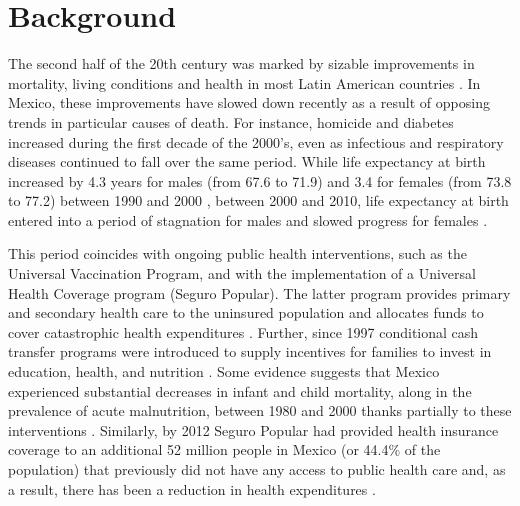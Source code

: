 \documentclass{bmcart}
\begin{document}



\section*{Background}
The second half of the 20th century was marked by sizable improvements in mortality, living
conditions and health in most Latin American countries \cite{who2000}. 
In Mexico, these improvements have slowed down recently as a result of opposing
trends in particular causes of death. For instance, homicide and diabetes
increased during the first decade of the 2000's, even as infectious and
respiratory diseases continued to fall over the same period. While life
expectancy at birth increased by 4.3 years for males (from 67.6 to 71.9) and 3.4
for females (from 73.8 to 77.2) between 1990 and 2000 \cite{SOMEDE},
between 2000 and 2010, life expectancy at birth entered into a period of
stagnation for males and slowed progress for females \cite{canudas2014}. 


This
period coincides with ongoing public health interventions, such as the Universal Vaccination Program, and with the implementation of a Universal Health Coverage program (Seguro
Popular). The latter program provides primary and secondary
health care to the uninsured population and allocates funds to cover catastrophic
health expenditures \cite{knaul2005}. Further, since 1997 conditional cash transfer programs were introduced to supply incentives for families to invest in education, health, and nutrition \cite{neufeld2012}. Some evidence
suggests that Mexico experienced substantial decreases in infant and child
mortality, along in the prevalence of acute malnutrition, between 1980 and 2000
thanks partially to these interventions \cite{sepulveda2006}. Similarly, by 2012 Seguro Popular had provided health insurance coverage to an additional 52 million
people in Mexico (or 44.4\% of the population) that previously did not have any access to public health care and, as a result, there has been a reduction in health expenditures \cite{knaul2012}.
\end{document}
